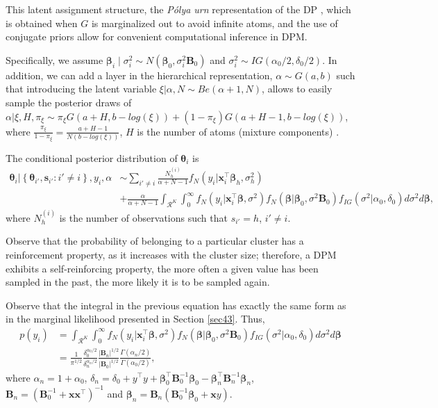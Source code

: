 This latent assignment structure, the \textit{Pólya urn} representation of the DP \cite{Blackwell1973}, which is obtained when \( G \) is marginalized out to avoid infinite atoms, and the use of conjugate priors allow for convenient computational inference in DPM.

Specifically, we assume $\boldsymbol{\beta}_i\mid \sigma^2_i\sim N(\boldsymbol{\beta}_0, \sigma^2_i\boldsymbol{B}_0)$ and $\sigma_i^2\sim IG(\alpha_0/2,\delta_0/2)$. In addition, we can add a layer in the hierarchical representation, $\alpha\sim G(a,b)$ such that introducing the latent variable $\xi|\alpha,N\sim Be(\alpha+1,N)$, allows to easily sample the posterior draws of  $\alpha|\xi,H,\pi_{\xi}\sim\pi_{\xi}{G}(a+H,b-log(\xi))+(1-\pi_{\xi}){G}(a+H-1,b-log(\xi))$, where $\frac{\pi_{\xi}}{1-\pi_{\xi}}=\frac{a+H-1}{N(b-log(\xi))}$, $H$ is the number of atoms (mixture components) \cite{Escobar1995}. 

The conditional posterior distribution of $\boldsymbol\theta_i$ is
\begin{align*}
	\boldsymbol\theta_i|\left\{\boldsymbol\theta_{i'},\boldsymbol s_{i'}:i'\neq i\right\}, y_i, \alpha & \sim \sum_{i'\neq i}\frac{N_h^{(i)}}{\alpha+N-1}f_N(y_i|\boldsymbol{x}_i^{\top}\boldsymbol{\beta}_h,\sigma_h^2)\\
	& +\frac{\alpha}{\alpha+N-1}\int_{\mathcal{R}^K}\int_{0}^{\infty}f_N(y_i|\boldsymbol{x}_i^{\top}\boldsymbol{\beta},\sigma^2)f_N\left(\boldsymbol\beta\Big|\boldsymbol\beta_0,\sigma^2\boldsymbol B_0\right)f_{IG}(\sigma^2|\alpha_0,\delta_0)d\sigma^2 d\boldsymbol\beta,
\end{align*}
where $N_h^{(i)}$ is the number of observations such that $s_{i'}=h$, $i'\neq i$.

Observe that the probability of belonging to a particular cluster has a reinforcement property, as it increases with the cluster size; therefore, a DPM exhibits a self-reinforcing property, the more often a given value has been sampled in the past, the more likely it is to be sampled again.

Observe that the integral in the previous equation has exactly the same form as in the marginal likelihood presented in Section \ref{sec43}. Thus,
\begin{align*}
	p(y_i)&=\int_{\mathcal{R}^K}\int_{0}^{\infty}f_N(y_i|\boldsymbol{x}_i^{\top}\boldsymbol{\beta},\sigma^2)f_N\left(\boldsymbol\beta\Big|\boldsymbol\beta_0,\sigma^2\boldsymbol B_0\right)f_{IG}(\sigma^2|\alpha_0,\delta_0)d\sigma^2 d\boldsymbol\beta\\
	&=\frac{1}{\pi^{1/2}}\frac{\delta_0^{\alpha_0/2}}{\delta_n^{\alpha_n/2}}\frac{|{\boldsymbol{B}}_n|^{1/2}}{|{\boldsymbol{B}}_0|^{1/2}}\frac{\Gamma(\alpha_n/2)}{\Gamma(\alpha_0/2)}, 
\end{align*}
where $\alpha_n=1+\alpha_0$, $\delta_n=\delta_0 + y^{\top}y + \boldsymbol{\beta}_0^{\top}{\boldsymbol{B}}_0^{-1}\boldsymbol{\beta}_0 - \boldsymbol{\beta}_n^{\top}{\boldsymbol{B}}_n^{-1}\boldsymbol{\beta}_n$,  $\boldsymbol{B}_n = (\boldsymbol{B}_0^{-1} + \boldsymbol{x}\boldsymbol{x}^{\top})^{-1}$ and $\boldsymbol{\beta}_n = \boldsymbol{B}_n(\boldsymbol{B}_0^{-1}\boldsymbol{\beta}_0 + \boldsymbol{x}y)$.

